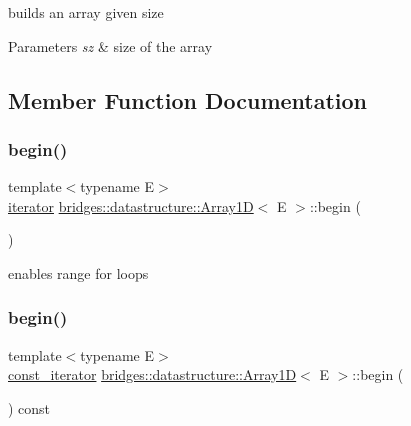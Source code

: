 builds an array given size 


\begin{DoxyParams}{Parameters}
{\em sz} & size of the array \\
\hline
\end{DoxyParams}


\subsection{Member Function Documentation}
\mbox{\label{classbridges_1_1datastructure_1_1_array1_d_ad93131c3f7f2e446bedc02d36ac7ddc5}} 
\subsubsection{\texorpdfstring{begin()}{begin()}\hspace{0.1cm}{\footnotesize\ttfamily [1/2]}}
{\footnotesize\ttfamily template$<$typename E$>$ \\
\mbox{\hyperlink{classbridges_1_1datastructure_1_1_array1_d_1_1iterator}{iterator}} \mbox{\hyperlink{classbridges_1_1datastructure_1_1_array1_d}{bridges\+::datastructure\+::\+Array1D}}$<$ E $>$\+::begin (\begin{DoxyParamCaption}{ }\end{DoxyParamCaption})\hspace{0.3cm}{\ttfamily [inline]}}



enables range for loops 

\mbox{\label{classbridges_1_1datastructure_1_1_array1_d_a61e7a77165129de2016633ce24284417}} 
\subsubsection{\texorpdfstring{begin()}{begin()}\hspace{0.1cm}{\footnotesize\ttfamily [2/2]}}
{\footnotesize\ttfamily template$<$typename E$>$ \\
\mbox{\hyperlink{classbridges_1_1datastructure_1_1_array1_d_1_1const__iterator}{const\+\_\+iterator}} \mbox{\hyperlink{classbridges_1_1datastructure_1_1_array1_d}{bridges\+::datastructure\+::\+Array1D}}$<$ E $>$\+::begin (\begin{DoxyParamCaption}{ }\end{DoxyParamCaption}) const\hspace{0.3cm}{\ttfamily [inline]}}




